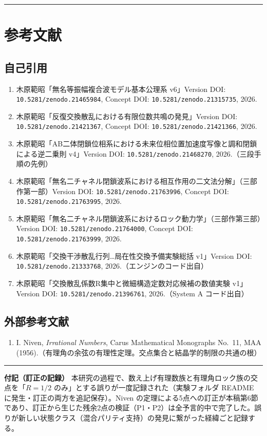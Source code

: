 \documentclass[
  a4paper,
]{ltjsarticle}
\providecommand{\tightlist}{%
  \setlength{\itemsep}{0pt}\setlength{\parskip}{0pt}}
\begin{document}
\begin{center}\rule{0.5\linewidth}{0.5pt}\end{center}

\section{参考文献}\label{ux53c2ux8003ux6587ux732e}

\subsection{自己引用}\label{ux81eaux5df1ux5f15ux7528}

\begin{enumerate}
\def\labelenumi{\arabic{enumi}.}
\tightlist
\item
  木原範昭「無名等振幅複合波モデル基本公理系 v6」Version DOI:
  \texttt{10.5281/zenodo.21465984}, Concept DOI:
  \texttt{10.5281/zenodo.21315735}, 2026.
\item
  木原範昭「反復交換散乱における有限位数共鳴の発見」Version DOI:
  \texttt{10.5281/zenodo.21421367}, Concept DOI:
  \texttt{10.5281/zenodo.21421366}, 2026.
\item
  木原範昭「AB二体閉鎖位相系における未来位相位置加速度写像と調和閉鎖による逆二乗則
  v4」Version DOI: \texttt{10.5281/zenodo.21468270},
  2026.（三段手順の先例）
\item
  木原範昭「無名二チャネル閉鎖波系における相互作用の二文法分解」（三部作第一部）Version
  DOI: \texttt{10.5281/zenodo.21763996}, Concept DOI:
  \texttt{10.5281/zenodo.21763995}, 2026.
\item
  木原範昭「無名二チャネル閉鎖波系におけるロック動力学」（三部作第三部）Version
  DOI: \texttt{10.5281/zenodo.21764000}, Concept DOI:
  \texttt{10.5281/zenodo.21763999}, 2026.
\item
  木原範昭「交換干渉散乱行列\ldots 局在性交換予備実験総括 v1」Version
  DOI: \texttt{10.5281/zenodo.21333768}, 2026.（エンジンのコード出自）
\item
  木原範昭「交換散乱係数R集中と微細構造定数対応候補の数値実験
  v1」Version DOI: \texttt{10.5281/zenodo.21396761}, 2026.（System A
  コード出自）
\end{enumerate}

\subsection{外部参考文献}\label{ux5916ux90e8ux53c2ux8003ux6587ux732e}

\begin{enumerate}
\def\labelenumi{\arabic{enumi}.}
\setcounter{enumi}{7}
\tightlist
\item
  I. Niven, \emph{Irrational Numbers}, Carus Mathematical Monographs
  No.~11, MAA
  (1956).（有理角の余弦の有理性定理。交点集合と結晶学的制限の共通の根）
\end{enumerate}

\begin{center}\rule{0.5\linewidth}{0.5pt}\end{center}

\textbf{付記（訂正の記録）}
本研究の過程で、数え上げ有理数族と有理角ロック族の交点を「\(R=1/2\)
のみ」とする誤りが一度記録された（実験フォルダ README
に発生・訂正の両方を追記保存）。Niven
の定理による5点への訂正が本稿第6節であり、訂正から生じた残余2点の検証（P1・P2）は全予言的中で完了した。誤りが新しい状態クラス（混合パリティ支持）の発見に繋がった経緯ごと記録する。
\end{document}

